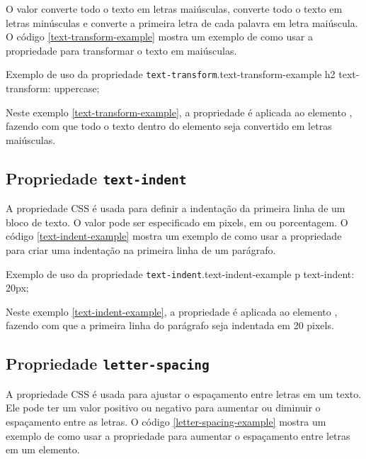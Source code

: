 O valor  converte todo o texto em letras maiúsculas,  converte todo o texto em letras minúsculas e  converte a primeira letra de cada palavra em letra maiúscula. O código \ref{text-transform-example} mostra um exemplo de como usar a propriedade  para transformar o texto em maiúsculas.

\begin{csscode}{Exemplo de uso da propriedade \texttt{text-transform}.}{text-transform-example}
h2 {
    text-transform: uppercase;
}
\end{csscode}

Neste exemplo \ref{text-transform-example}, a propriedade  é aplicada ao elemento , fazendo com que todo o texto dentro do elemento seja convertido em letras maiúsculas.

\subsection{Propriedade \texttt{text-indent}}

A propriedade CSS  é usada para definir a indentação da primeira linha de um bloco de texto. O valor pode ser especificado em pixels, em ou porcentagem. O código \ref{text-indent-example} mostra um exemplo de como usar a propriedade  para criar uma indentação na primeira linha de um parágrafo.

\begin{csscode}{Exemplo de uso da propriedade \texttt{text-indent}.}{text-indent-example}
p {
    text-indent: 20px;
}
\end{csscode}

Neste exemplo \ref{text-indent-example}, a propriedade  é aplicada ao elemento , fazendo com que a primeira linha do parágrafo seja indentada em 20 pixels.

\subsection{Propriedade \texttt{letter-spacing}}

A propriedade CSS  é usada para ajustar o espaçamento entre letras em um texto. Ele pode ter um valor positivo ou negativo para aumentar ou diminuir o espaçamento entre as letras. O código \ref{letter-spacing-example} mostra um exemplo de como usar a propriedade  para aumentar o espaçamento entre letras em um elemento.

